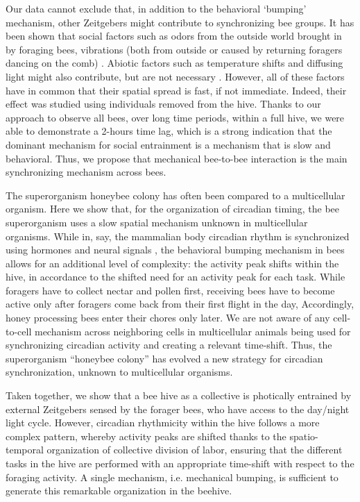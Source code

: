 \documentclass{article}
\begin{document}
Our data cannot exclude that, in addition to the behavioral ‘bumping’ mechanism, other Zeitgebers might contribute to synchronizing bee groups. It has been shown that social factors such as odors from the outside world brought in by foraging bees, vibrations (both from outside or caused by returning foragers dancing on the comb) \cite{moritz_self-organization_1994, siehler_colony_2020, siehler_remarkable_2021}. Abiotic factors such as temperature shifts and diffusing light might also contribute, but are not necessary \cite{siehler_remarkable_2021}. However, all of these factors have in common that their spatial spread is fast, if not immediate. Indeed, their effect was studied using individuals removed from the hive. Thanks to our approach to observe all bees, over long time periods, within a full hive, we were able to demonstrate a 2-hours time lag, which is a strong indication that the dominant mechanism for social entrainment is a mechanism that is slow and behavioral. Thus, we propose that mechanical bee-to-bee interaction is the main synchronizing mechanism across bees. 
 
The superorganism honeybee colony has often been compared to a multicellular organism. Here we show that, for the organization of circadian timing, the bee superorganism uses a slow spatial mechanism unknown in multicellular organisms. While in, say, the mammalian body circadian rhythm is synchronized using hormones and neural signals \cite{finger_coupled_2020, pilorz_concept_2020}, the behavioral bumping mechanism in bees allows for an additional level of complexity: the activity peak shifts within the hive, in accordance to the shifted need for an activity peak for each task. While foragers have to collect nectar and pollen first, receiving bees have to become active only after foragers come back from their first flight in the day, Accordingly, honey processing bees enter their chores only later. We are not aware of any cell-to-cell mechanism across neighboring cells in multicellular animals being used for synchronizing circadian activity and creating a relevant time-shift. Thus, the superorganism “honeybee colony” has evolved a new strategy for circadian synchronization, unknown to multicellular organisms. 

Taken together, we show that a bee hive as a collective is photically entrained by external Zeitgebers sensed by the forager bees, who have access to the day/night light cycle. However, circadian rhythmicity within the hive follows a more complex pattern, whereby activity peaks are shifted thanks to the spatio-temporal organization of collective division of labor, ensuring that the different tasks in the hive are performed with an appropriate time-shift with respect to the foraging activity. A single mechanism, i.e. mechanical bumping, is sufficient to generate this remarkable organization in the beehive. 
 
\end{document}

